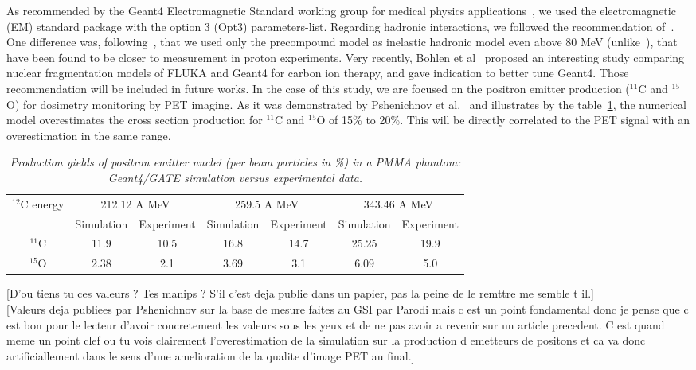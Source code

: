 \documentclass[11pt]{iopart}
\newcommand{\dsnote}[1]{{\color{green}[#1]}}
\newcommand{\sjnote}[1]{{\color{red}[#1]}}
\begin{document}
As recommended by the Geant4 Electromagnetic Standard working group
for medical physics applications~\cite{G4EMGroup2010}, we used the
electromagnetic (EM) standard package with the option 3 (Opt3)
parameters-list. Regarding hadronic interactions, we followed the
recommendation of~\cite{Pshenichnov2007, Zacharatou2008}. One
difference was, following~\cite{Polf2009, Peterson2009,
  Grevillot2010}, that we used only the precompound model as inelastic
hadronic model even above 80 MeV (unlike~\cite{Pshenichnov2007}), that
have been found to be closer to measurement in proton
experiments. Very recently, Bohlen et al~\cite{Bohlen2010} proposed an
interesting study comparing nuclear fragmentation models of FLUKA and
Geant4 for carbon ion therapy, and gave indication to better tune
Geant4. Those recommendation will be included in future works.  In the
case of this study, we are focused on the positron emitter production
($^{11}$C and $^{15}$O) for dosimetry monitoring by PET imaging. As it
was demonstrated by Pshenichnov et al.~\cite{Pshenichnov2006} and
illustrates by the table~\ref{tab:CrossSection}, the numerical model
overestimates the cross section production for $^{11}$C and $^{15}$O
of 15\% to 20\%. This will be directly correlated to the PET signal
with an overestimation in the same range.

\begin{table}[htbp]
\begin{center}
  \begin{tabular}{|c|c|c|c|c|c|c|} \hline
    $^{12}$C energy  & \multicolumn{2}{|c|}{212.12 A MeV}  & \multicolumn{2}{|c|}{259.5 A MeV}  & \multicolumn{2}{|c|}{343.46 A MeV}       \\
    \cline{2-7} & Simulation & Experiment & Simulation & Experiment &
    Simulation & Experiment \\ \hline \hline 
    $^{11}$C             & 11.9  &  10.5  &  16.8  &  14.7  &  25.25  &  19.9      \\ \hline
    $^{15}$O             & 2.38  &  2.1  &  3.69  &  3.1   &  6.09   &  5.0        \\ \hline \hline 

\end{tabular}
\end{center} 
\caption{\it Production yields of positron emitter nuclei (per beam particles in \%) in a PMMA phantom: Geant4/GATE simulation versus experimental data.} 
\label{tab:CrossSection}
\end{table}

\dsnote{D'ou tiens tu ces valeurs ? Tes manips ? S'il c'est deja publie dans un papier, pas la peine de le remttre me semble t il.}\\
\sjnote{Valeurs deja publiees par Pshenichnov sur la base de mesure faites au GSI par Parodi mais c est un point fondamental donc je pense que c est bon pour le lecteur d'avoir concretement les valeurs sous les yeux et de ne pas avoir a revenir sur un article precedent. C est quand meme un point clef ou tu vois clairement l'overestimation de la simulation sur la production d emetteurs de positons et ca va donc artificiallement dans le sens d'une amelioration de la qualite d'image PET au final.}
\end{document}
